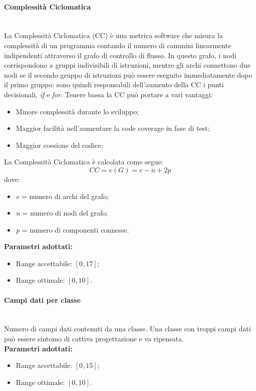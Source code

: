 \paragraph{Complessità Ciclomatica}\mbox{}\\[0,3cm]
La Complessità Ciclomatica (CC) è una metrica software che misura la complessità di un programma contando il numero di cammini linearmente indipendenti attraverso il grafo di controllo di flusso. In questo grafo, i nodi corrispondono a gruppi indivisibili di istruzioni, mentre gli archi connettono due nodi se il secondo gruppo di istruzioni può essere eseguito immediatamente dopo il primo gruppo: sono quindi responsabili dell'aumento della CC i punti decisionali, \emph{if} e \emph{for}.
Tenere bassa la CC può portare a vari vantaggi:
\begin{itemize}
	\item Minore complessità durante lo sviluppo;
	\item Maggior facilità nell'aumentare la code coverage in fase di test;
	\item Maggior coesione del codice;
\end{itemize}
La Complessità Ciclomatica è calcolata come segue:
\[
CC = v(G) = e - n + 2p
\]
dove:
\begin{itemize}
	\item \emph{e} = numero di archi del grafo;
	\item \emph{n} = numero di nodi del grafo;
	\item \emph{p} = numero di componenti connesse.
\end{itemize}
\textbf{Parametri adottati:}
\begin{itemize}
	\item Range accettabile: $[0,17]$;
	\item Range ottimale: $[0,10]$.
\end{itemize}

\paragraph{Campi dati per classe}\mbox{}\\[0,3cm]
Numero di campi dati contenuti da una classe. Una classe con troppi campi dati può essere sintomo di cattiva progettazione e va ripensata.\\[0,2cm]
\textbf{Parametri adottati:}
\begin{itemize}
	\item Range accettabile: $[0,15]$;
	\item Range ottimale: $[0,10]$.
\end{itemize}

